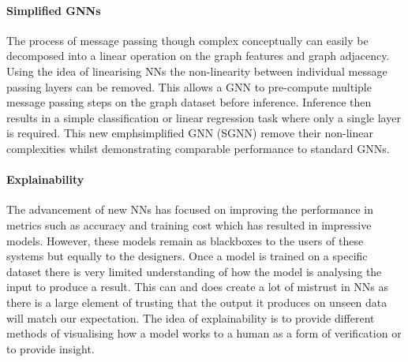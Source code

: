 \paragraph{Simplified GNNs}
The process of message passing though complex conceptually can easily be decomposed into a linear operation on the graph features and graph adjacency.
Using the idea of linearising NNs the non-linearity between individual message passing layers can be removed.
This allows a GNN to pre-compute multiple message passing steps on the graph dataset before inference.
Inference then results in a simple classification or linear regression task where only a single layer is required.
This new emph{simplified GNN} (SGNN) remove their non-linear complexities whilst demonstrating comparable performance to standard GNNs.

\paragraph{Explainability}
The advancement of new NNs has focused on improving the performance in metrics such as accuracy and training cost which has resulted in impressive models.
However, these models remain as blackboxes to the users of these systems but equally to the designers.
Once a model is trained on a specific dataset there is very limited understanding of how the model is analysing the input to produce a result.
This can and does create a lot of mistrust in NNs as there is a large element of trusting that the output it produces on unseen data will match our expectation.
The idea of explainability is to provide different methods of visualising how a model works to a human as a form of verification or to provide insight.





